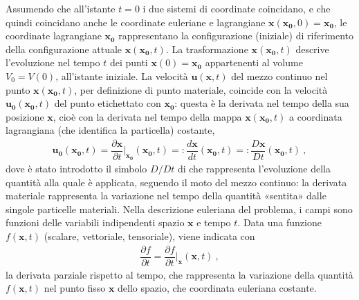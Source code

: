 \documentclass[letterpaper,10pt,italian]{jupyterBook}
\begin{document}
\sphinxAtStartPar
Assumendo che all’istante \(t=0\) i due sistemi di coordinate coincidano,
e che quindi coincidano anche le coordinate euleriane e lagrangiane
\(\mathbf{x}(\mathbf{x_0},0) = \mathbf{x_0}\), le coordinate lagrangiane \(\mathbf{x_0}\)
rappresentano la configurazione (iniziale) di riferimento della
configurazione attuale \(\mathbf{x}(\mathbf{x_0},t)\). La trasformazione
\(\mathbf{x}(\mathbf{x_0},t)\) descrive l’evoluzione nel tempo \(t\) dei punti
\(\mathbf{x}(0) = \mathbf{x_0}\) appartenenti al volume \(V_0 = V(0)\), all’istante
iniziale. La velocità \(\mathbf{u}(\mathbf{x},t)\) del mezzo continuo nel punto
\(\mathbf{x}(\mathbf{x_0},t)\), per definizione di punto materiale, coincide con
la velocità \(\mathbf{u_0}(\mathbf{x_0},t)\) del punto etichettato con \(\mathbf{x_0}\):
questa è la derivata nel tempo della sua posizione \(\mathbf{x}\), cioè con la
derivata nel tempo della mappa \(\mathbf{x}(\mathbf{x_0},t)\) a coordinata
lagrangiana (che identifica la particella) costante,
\begin{equation*}
\begin{split}\mathbf{u_0}(\mathbf{x_0},t) = \dfrac{\partial \mathbf{x}}{\partial t}\bigg|_{\mathbf{x_0}}(\mathbf{x_0},t) =: \dfrac{d \mathbf{x}}{d t}(\mathbf{x_0},t) =: \dfrac{D\mathbf{x}}{D t}(\mathbf{x_0},t) \ ,\end{split}
\end{equation*}
\sphinxAtStartPar
dove è stato introdotto il simbolo \(D/Dt\) di  che
rappresenta l’evoluzione della quantità alla quale è applicata, seguendo
il moto del mezzo continuo: la derivata materiale rappresenta la
variazione nel tempo della quantità «sentita» dalle singole particelle
materiali. Nella descrizione euleriana del problema, i campi sono
funzioni delle variabili indipendenti spazio \(\mathbf{x}\) e tempo \(t\). Data
una funzione \(f(\mathbf{x},t)\) (scalare, vettoriale, tensoriale), viene
indicata con
\begin{equation*}
\begin{split}\dfrac{\partial f}{\partial t} = \dfrac{\partial f}{\partial t}\bigg|_{\mathbf{x}}(\mathbf{x},t) \ ,\end{split}
\end{equation*}
\sphinxAtStartPar
la derivata parziale rispetto al tempo, che rappresenta la variazione
della quantità \(f(\mathbf{x},t)\) nel punto fisso \(\mathbf{x}\) dello spazio, che
coordinata euleriana costante.
\end{document}
